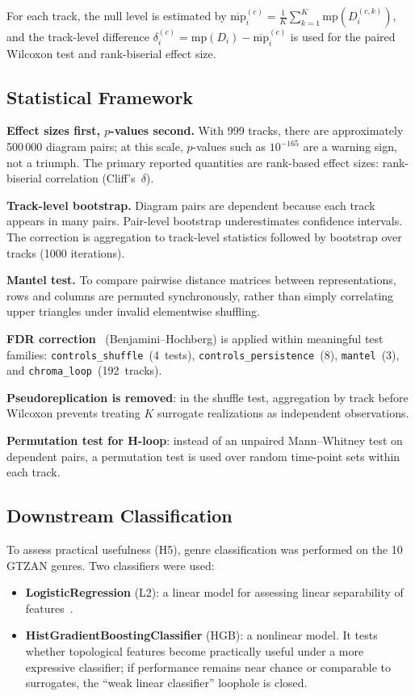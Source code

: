 For each track, the null level is estimated by $\overline{\mathrm{mp}}^{(c)}_i=\frac{1}{K}\sum_{k=1}^{K}\mathrm{mp}(D_i^{(c,k)})$, and the track-level difference $\delta_i^{(c)}=\mathrm{mp}(D_i)-\overline{\mathrm{mp}}^{(c)}_i$ is used for the paired Wilcoxon test and rank-biserial effect size.

\subsection{Statistical Framework}\label{ssec:stats}

\textbf{Effect sizes first, $p$-values second.} With 999 tracks, there are approximately 500\,000 diagram pairs; at this scale, $p$-values such as $10^{-165}$ are a warning sign, not a triumph. The primary reported quantities are rank-based effect sizes: rank-biserial correlation (Cliff's~$\delta$).

\textbf{Track-level bootstrap.} Diagram pairs are dependent because each track appears in many pairs. Pair-level bootstrap underestimates confidence intervals. The correction is aggregation to track-level statistics followed by bootstrap over tracks (1000 iterations).

\textbf{Mantel test.} To compare pairwise distance matrices between representations, rows and columns are permuted synchronously, rather than simply correlating upper triangles under invalid elementwise shuffling.

\textbf{FDR correction}~\cite{benjamini1995controlling} (Benjamini--Hochberg) is applied within meaningful test families:
\texttt{controls\_shuffle}~(4~tests),
\texttt{controls\_persistence}~(8),
\texttt{mantel}~(3), and
\texttt{chroma\_loop}~(192~tracks).

\textbf{Pseudoreplication is removed}: in the shuffle test, aggregation by track before Wilcoxon prevents treating $K$ surrogate realizations as independent observations.

\textbf{Permutation test for H-loop}: instead of an unpaired Mann--Whitney test on dependent pairs, a permutation test is used over random time-point sets within each track.

\subsection{Downstream Classification}\label{ssec:classify}

To assess practical usefulness (H5), genre classification was performed on the 10 GTZAN genres. Two classifiers were used:
\begin{itemize}
    \item \textbf{LogisticRegression} (L2): a linear model for assessing linear separability of features~\cite{pedregosa2011sklearn}.
    \item \textbf{HistGradientBoostingClassifier} (HGB): a nonlinear model. It tests whether topological features become practically useful under a more expressive classifier; if performance remains near chance or comparable to surrogates, the ``weak linear classifier'' loophole is closed.
\end{itemize}

